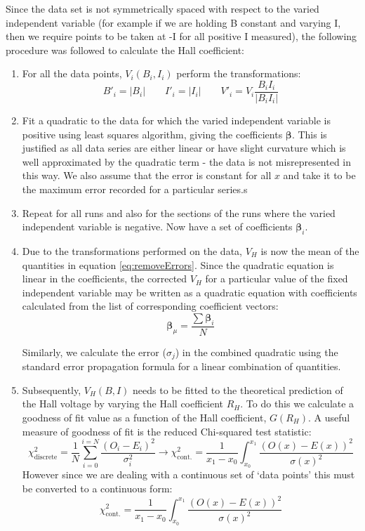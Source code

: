 \documentclass{article}
\begin{document}
		\noindent Since the data set is not symmetrically spaced with respect to the varied independent variable (for example if we are holding B constant and varying I, then we require points to be taken at -I for all positive I measured), the following procedure was followed to calculate the Hall coefficient:
		
		\begin{enumerate}
			\item For all the data points, $V_i(B_i,I_i)$ perform the transformations:
			\[B'_i = |B_i| \qquad I'_i = |I_i| \qquad V'_i = V_i\frac{B_iI_i}{|B_iI_i|}\]
			
			\item Fit a quadratic to the data for which the varied independent variable is positive using least squares algorithm, giving the coefficients $\boldsymbol{\beta}$. This is justified as all data series are either linear or have slight curvature which is well approximated by the quadratic term - the data is not misrepresented in this way. We also assume that the error is constant for all $x$ and take it to be the maximum error recorded for a particular series.s
			
			\item Repeat for all runs and also for the sections of the runs where the varied independent variable is negative. Now have a set of coefficients $\boldsymbol{\beta}_i$.
			
			\item Due to the transformations performed on the data, $V_H$ is now the mean of the quantities in equation \ref{eq:removeErrors}. Since the quadratic equation is linear in the coefficients, the corrected $V_H$ for a particular value of the fixed independent variable may be written as a quadratic equation with coefficients calculated from the list of corresponding coefficient vectors:
			\[ \boldsymbol{\beta}_\mu = \frac{\sum\boldsymbol{\beta}_i}{N} \]
			
			\noindent Similarly, we calculate the error ($\sigma_j$) in the combined quadratic using the standard error propagation formula for a linear combination of quantities.
			
			\item Subsequently, $V_H(B,I)$ needs to be fitted to the theoretical prediction of the Hall voltage by varying the Hall coefficient $R_H$. To do this we calculate a goodness of fit value as a function of the Hall coefficient, $G(R_H)$. A useful measure of goodness of fit is the reduced Chi-squared test statistic:
			\begin{equation}
				\chi^2_{\textrm{discrete}} = \frac{1}{N}\sum_{i=0}^{i=N}\frac{(O_i-E_i)^2}{\sigma_i^2} \rightarrow \chi^2_{\textrm{cont.}} = \frac{1}{x_1-x_0}\int_{x_0}^{x_1}\frac{(O(x)-E(x))^2}{\sigma(x)^2}
			\end{equation}
			\noindent However since we are dealing with a continuous set of `data points' this must be converted to a continuous form:
			\begin{equation}
				\chi^2_{\textrm{cont.}} = \frac{1}{x_1-x_0}\int_{x_0}^{x_1}\frac{(O(x)-E(x))^2}{\sigma(x)^2}
			\end{equation}
			

\end{enumerate}
\end{document}
